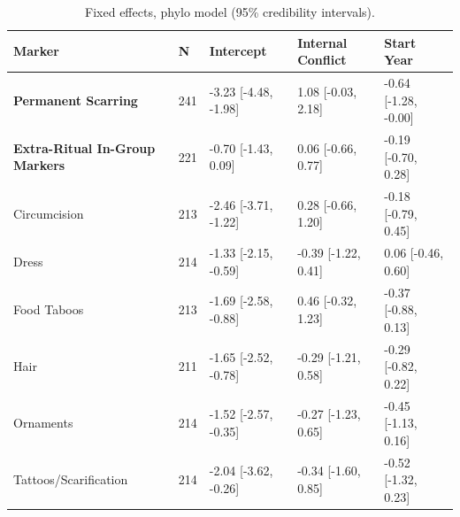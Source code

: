 \begin{table}[!ht]
\centering
\small
\caption{Fixed effects, phylo model (95\% credibility intervals).}
\label{tab:int_fixed_effects_phylo}
\begin{tabular}{p{4cm}llll}
\toprule
Marker & N & Intercept & Internal Conflict & Start Year \\
\midrule
\textbf{Permanent Scarring} & 241 & -3.23 [-4.48, -1.98] & 1.08 [-0.03, 2.18] & -0.64 [-1.28, -0.00] \\
\textbf{Extra-Ritual In-Group Markers} & 221 & -0.70 [-1.43, 0.09] & 0.06 [-0.66, 0.77] & -0.19 [-0.70, 0.28] \\
\midrule
Circumcision & 213 & -2.46 [-3.71, -1.22] & 0.28 [-0.66, 1.20] & -0.18 [-0.79, 0.45] \\
Dress & 214 & -1.33 [-2.15, -0.59] & -0.39 [-1.22, 0.41] & 0.06 [-0.46, 0.60] \\
Food Taboos & 213 & -1.69 [-2.58, -0.88] & 0.46 [-0.32, 1.23] & -0.37 [-0.88, 0.13] \\
Hair & 211 & -1.65 [-2.52, -0.78] & -0.29 [-1.21, 0.58] & -0.29 [-0.82, 0.22] \\
Ornaments & 214 & -1.52 [-2.57, -0.35] & -0.27 [-1.23, 0.65] & -0.45 [-1.13, 0.16] \\
Tattoos/Scarification & 214 & -2.04 [-3.62, -0.26] & -0.34 [-1.60, 0.85] & -0.52 [-1.32, 0.23] \\
\bottomrule
\end{tabular}
\end{table}